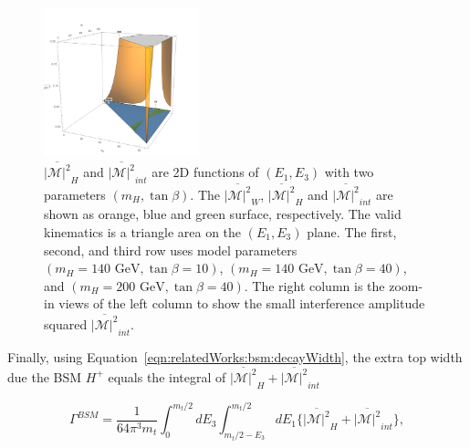 \begin{figure}[ht]
    \includegraphics[width=0.4\textwidth]{chapters/RelatedWorks/sectionBSM/figures/zoom_2HDM_200_40.png}
    \caption{  $\overline{ |\mathcal{M}|^2 } _{H}$ and $ \overline{ |\mathcal{M}|^2 } _{int}$ are 2D functions of $(E_1, E_3)$ with two parameters $(m_H, \tan\beta)$. The $\overline{ |\mathcal{M}|^2 } _{W}$, $\overline{ |\mathcal{M}|^2 } _{H} $ and $\overline{ |\mathcal{M}|^2 } _{int}$ are shown as orange, blue and green surface, respectively. The valid kinematics is a triangle area on the $(E_1, E_3)$  plane. The first, second, and third row uses model parameters $(m_H = 140 \text{ GeV}, \tan\beta=10)$, $(m_H = 140 \text{ GeV}, \tan\beta=40)$, and $(m_H = 200 \text{ GeV}, \tan\beta=40)$. The right column is the zoom-in views of the left column to show the small interference amplitude squared $ \overline{ |\mathcal{M}|^2 } _{int}$.}
    \label{fig:relatedWorks:bsm:chargedHiggs:m2}
\end{figure}




Finally, using Equation~\ref{eqn:relatedWorks:bsm:decayWidth}, the extra top width due the BSM $H^+$ equals the integral of  $\overline{ |\mathcal{M}|^2 } _{H} +  \overline{ |\mathcal{M}|^2 } _{int}$

\begin{equation}
	\Gamma^{BSM} = \frac{1}{64 \pi^3 m_t} \int_{0}^{m_t/2} dE_3 \int_{m_t/2-E_3}^{m_t/2} dE_1  \bigg\{ \overline{ |\mathcal{M}|^2 } _{H} +  \overline{ |\mathcal{M}|^2}_{int}  \bigg \},
\end{equation}

